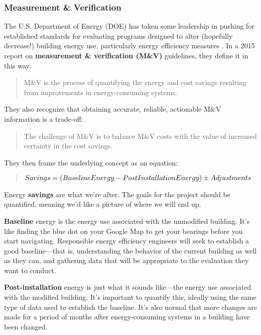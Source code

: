 \documentclass[10pt]{article}
\begin{document}
\subsubsection{Measurement \& Verification}

The U.S. Department of Energy (DOE) has taken some leadership in pushing for established standards for evaluating programs designed to alter (hopefully decrease!) building energy use, particularly energy efficiency measures \cite{MandV}. In a 2015 report on \textbf{measurement \& verification (M\&V)} guidelines, they define it in this way:

\begin{quote}
M\&V is the process of quantifying the energy and cost savings resulting from improvements in energy-consuming systems. \cite{MandV}
\end{quote}

They also recognize that obtaining accurate, reliable, actionable M\&V information is a trade-off:

\begin{quote}
The challenge of M\&V is to balance M\&V costs with the value of increased certainty in the cost savings. \cite{MandV}
\end{quote}

They then frame the underlying concept as an equation:

\begin{quote}
  $ Savings = (Baseline  Energy - Post\-Installation  Energy) \pm Adjustments   $ \cite{MandV}  
\end{quote}

Energy \textbf{savings} are what we're after. The goals for the project should be quantified, meaning we'd like a picture of where we will end up.

\textbf{Baseline} energy is the energy use associated with the unmodified building. It's like finding the blue dot on your Google Map to get your bearings before you start navigating. Responsible energy efficiency engineers will seek to establish a good baseline---that is, understanding the behavior of the current building as well as they can, and gathering data that will be appropriate to the evaluation they want to conduct.

\textbf{Post-installation} energy is just what it sounds like---the energy use associated with the modified building. It's important to quantify this, ideally using the same type of data used to establish the baseline. It's also normal that more changes are made for a period of months after energy-consuming systems in a building have been changed.
\end{document}
